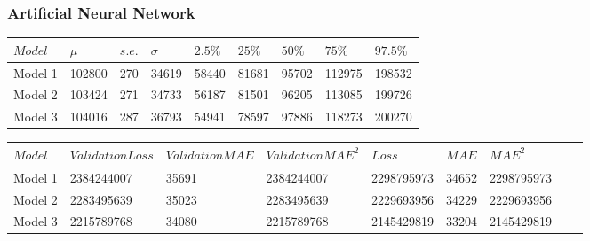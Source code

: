 \documentclass[a4paper,UKenglish]{lipics-v2018}
\begin{document}
\subsubsection{Artificial Neural Network}
\begin{table}
 \label{tab:table5}

\begin{tabular}{p{2.4cm}p{2.4cm}p{1.5cm}p{1.5cm}p{1.5cm}p{2cm}p{2cm}p{2cm}p{2cm}}
    \toprule
    {$Model$} & {$\mu$} & {$s.e.$} & {$\sigma$} & {$2.5\%$} & {$25\%$} & {$50\%$} & {$75\%$}  & {$97.5\%$} \\ \midrule
    Model 1 & 102800 & 270 & 34619 & 58440 & 81681 & 95702 & 112975 & 198532  \\
    Model 2 & 103424 &271 &34733 & 56187 & 81501 & 96205 & 113085 & 199726   \\
    Model 3 & 104016 & 287 & 36793  & 54941 & 78597 & 97886 & 118273 & 200270 \\
     \bottomrule
\end{tabular}

\bigskip\bigskip\bigskip\bigskip
{} \label{tab:table6}
\begin{tabular}{p{2.4cm}p{2.4cm}p{3cm}p{3.2cm}p{2.4cm}p{2.4cm}p{2.4cm}p{2.4cm}p{2.4cm}}
    \toprule
    {$Model$} & {$Validation Loss$} & {$Validation MAE$} & {$Validation MAE^2$} & {$Loss$} & {$MAE$} & {$MAE^2$}
    \\ \midrule
    Model 1 & 2384244007 & 35691 & 2384244007 & 2298795973 & 34652 & 2298795973  \\
    Model 2 & 2283495639 &35023 &2283495639 & 2229693956 & 34229 & 2229693956   \\
    Model 3 & 2215789768 & 34080 & 2215789768  & 2145429819 & 33204 & 2145429819 \\
     \bottomrule
\end{tabular}
\end{table}

\begin{figure}[H]
\end{figure}
\pagebreak
\end{document}
